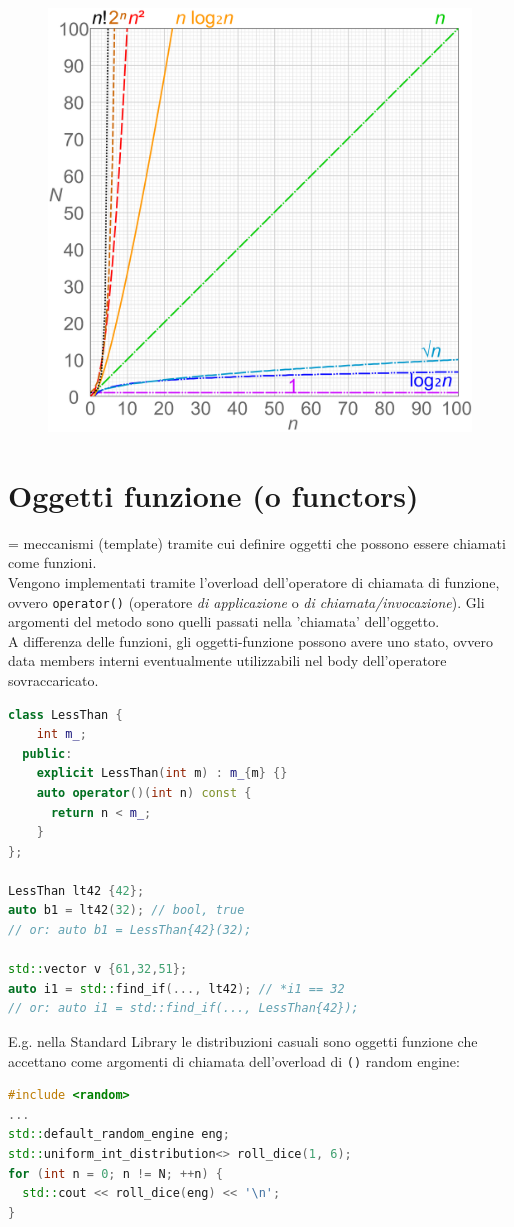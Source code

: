 \documentclass[10pt, oneside]{book}
\begin{document}
\begin{figure}[h!]
\centering
\includegraphics[scale=0.09]{complexity.png}
\end{figure}

\section{Oggetti funzione (o functors)}
= meccanismi (template) tramite cui definire oggetti che possono essere chiamati come funzioni.\\
Vengono implementati tramite l'overload dell'operatore di chiamata di funzione, ovvero \texttt{operator()} (operatore \textit{di applicazione} o \textit{di chiamata/invocazione}). Gli argomenti del metodo sono quelli passati nella 'chiamata' dell'oggetto.\\
A differenza delle funzioni, gli oggetti-funzione possono avere uno stato, ovvero data members interni eventualmente utilizzabili nel body dell'operatore sovraccaricato.
\begin{lstlisting}[language=C++]
class LessThan {
    int m_;
  public:
    explicit LessThan(int m) : m_{m} {}
    auto operator()(int n) const {
      return n < m_;
    }
};

LessThan lt42 {42};
auto b1 = lt42(32); // bool, true
// or: auto b1 = LessThan{42}(32);

std::vector v {61,32,51};
auto i1 = std::find_if(..., lt42); // *i1 == 32
// or: auto i1 = std::find_if(..., LessThan{42});
\end{lstlisting}
E.g. nella Standard Library le distribuzioni casuali sono oggetti funzione che accettano come argomenti di chiamata dell'overload di \texttt{()} random engine:
\begin{lstlisting}[language=C++]
#include <random>
...
std::default_random_engine eng;
std::uniform_int_distribution<> roll_dice(1, 6);
for (int n = 0; n != N; ++n) {
  std::cout << roll_dice(eng) << '\n';
}
\end{lstlisting}
\end{document}
